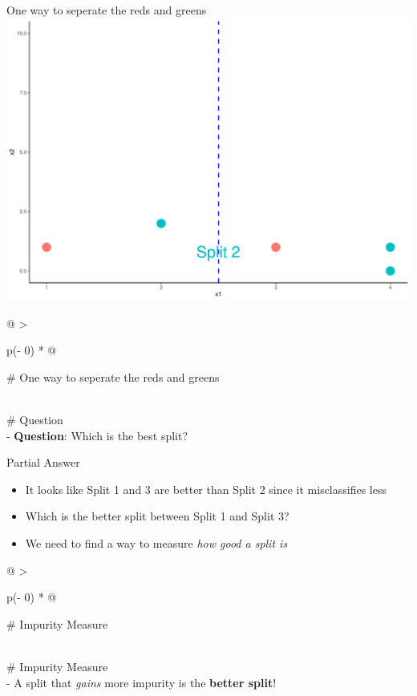 \documentclass[
  ignorenonframetext,
]{beamer}
\providecommand{\tightlist}{%
  \setlength{\itemsep}{0pt}\setlength{\parskip}{0pt}}
\begin{document}
\begin{frame}{One way to seperate the reds and greens}
\protect\hypertarget{one-way-to-seperate-the-reds-and-greens}{}
\includegraphics{classification_tree_files/figure-beamer/unnamed-chunk-3-1.pdf}

\begin{longtable}[]{@{}
  >{\raggedright\arraybackslash}p{(\columnwidth - 0\tabcolsep) * }@{}}
\toprule
\begin{minipage}[b]{\linewidth}\raggedright
\# One way to seperate the reds and greens
\end{minipage} \\
\midrule
\endhead
\# Question \\
- \textbf{Question}: Which is the best split? \\
\bottomrule
\end{longtable}
\end{frame}

\begin{frame}{Partial Answer}
\protect\hypertarget{partial-answer}{}
\begin{itemize}
\tightlist
\item
  It looks like Split 1 and 3 are better than Split 2 since it
  misclassifies less
\item
  Which is the better split between Split 1 and Split 3?
\item
  We need to find a way to measure \emph{how good a split is}
\end{itemize}

\begin{longtable}[]{@{}
  >{\raggedright\arraybackslash}p{(\columnwidth - 0\tabcolsep) * }@{}}
\toprule
\begin{minipage}[b]{\linewidth}\raggedright
\# Impurity Measure
\end{minipage} \\
\midrule
\endhead
\# Impurity Measure \\
- A split that \emph{gains} more impurity is the \textbf{better
split}! \\
\bottomrule
\end{longtable}
\end{frame}
\end{document}
